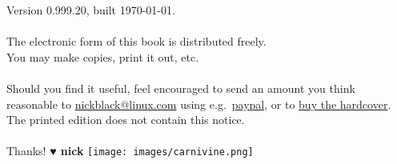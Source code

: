 \clearpage
\noindent{}Version 0.999.20, built \today.\\
\\
The electronic form of this book is distributed freely.\\
You may make copies, print it out, etc.\\
\\
Should you find it useful, feel encouraged to send an amount you think reasonable to
  \href{mailto:nickblack@linux.com}{nickblack@linux.com} using
  e.g.\ \href{https://paypal.me/dankamongmen}{paypal},
  or to \href{https://goldandappelpub.com/pgo-quantitative.html}{buy the hardcover}.
The printed edition does not contain this notice.\\
\\
Thanks! {\textbf{♥ nick}}
\vfill\texttt{[image: images/carnivine.png]}\vfill
